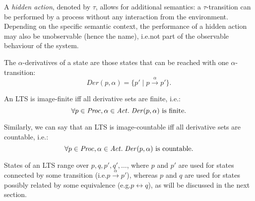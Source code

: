 \begin{isabellebody}
\begin{isamarkuptext}
{}

A \emph{hidden action}, denoted by $\tau$, allows for additional semantics: a $\tau$-transition can be performed by a process without any interaction from the environment. Depending on the specific semantic context, the performance of a hidden action may also be unobservable (hence the name), i.e.\@ not part of the observable behaviour of the system.%
\end{isamarkuptext}\isamarkuptrue%
%
\isadelimdocument
%
\endisadelimdocument
%
\isatagdocument
%
\isamarkuptrue%
%
\endisatagdocument
{\isafolddocument}%
%
\isadelimdocument
%
\endisadelimdocument
%
\begin{isamarkuptext}%
The $\alpha$-derivatives of a state are those states that can be reached with one $\alpha$-transition:
$$\mathit{Der}(p, \alpha) = \{ p' \mid p \xrightarrow{\alpha} p' \}.$$

An LTS is image-finite iff all derivative sets are finite, i.e.:
$$\forall p \in \mathit{Proc}, \alpha \in \mathit{Act} .\; \mathit{Der}(p, \alpha) \text{ is finite}.$$

Similarly, we can say that an LTS is image-countable iff all derivative sets are countable, i.e.:
$$\forall p \in \mathit{Proc}, \alpha \in \mathit{Act} .\; \mathit{Der}(p, \alpha) \text{ is countable}.$$%
\end{isamarkuptext}\isamarkuptrue%
%
\isadelimdocument
%
\endisadelimdocument
%
\isatagdocument
%
\isamarkuptrue%
%
\endisatagdocument
{\isafolddocument}%
%
\isadelimdocument
%
\endisadelimdocument
%
\begin{isamarkuptext}%
States of an LTS range over $p, q, p', q', \dots$, where $p$ and $p'$ are used for states connected by some transition (i.e.\@ $p \xrightarrow{\alpha} p'$), whereas $p$ and $q$ are used for states possibly related by some equivalence (e.g.\@ $p \leftrightarrow q$), as will be discussed in the next section.


\end{isamarkuptext}
\end{isabellebody}

